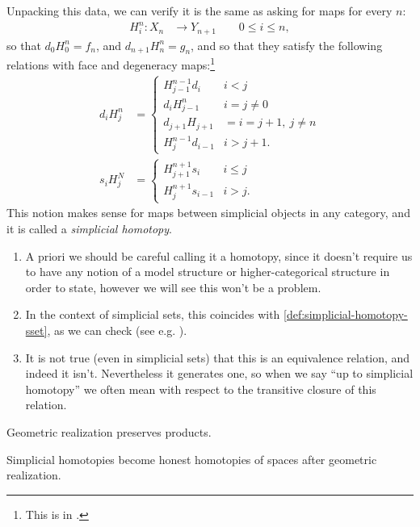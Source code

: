 \documentclass[11pt]{amsart}
\begin{document}
\begin{remark}
Unpacking this data, we can verify it is the same as asking for maps for every $n$:
\begin{align*}
    H_i^n \colon X_n &\to Y_{n+1} \quad\quad 0\le i\le n,
\end{align*}
so that $d_0 H_0^n = f_n$, and $d_{n+1}H_n^n = g_n$, and so that they satisfy the following relations with face and degeneracy maps:\footnote{%
This is in \cite[8.3.11]{Weibel}.
}
\begin{align*}
    d_i H_j^n &= \begin{cases}
    H_{j-1}^{n-1}d_i & i<j \\
    d_i H_{j-1}^n & i=j\ne 0 \\
    d_{j+1} H_{j+1} &= i = j+1,\ j\ne n \\
    H_{j}^{n-1} d_{i-1} & i > j+1.
    \end{cases} \\
    s_i H_j^N &= \begin{cases}
    H_{j+1}^{n+1} s_i & i\le j \\
    H_{j}^{n+1} s_{i-1} & i>j.
    \end{cases}
\end{align*}
This notion makes sense for maps between simplicial objects in any category, and it is called a \textit{simplicial homotopy}.
\begin{enumerate}
    \item A priori we should be careful calling it a homotopy, since it doesn't require us to have any notion of a model structure or higher-categorical structure in order to state, however we will see this won't be a problem.
    \item In the context of simplicial sets, this coincides with \autoref{def:simplicial-homotopy-sset}, as we can check (see e.g. \cite[8.3.12]{Weibel}).
    \item It is not true (even in simplicial sets) that this is an equivalence relation, and indeed it isn't. Nevertheless it generates one, so when we say ``up to simplicial homotopy'' we often mean with respect to the transitive closure of this relation.
\end{enumerate}
\end{remark}


\begin{theorem} Geometric realization preserves products.
\end{theorem}

\begin{corollary} Simplicial homotopies become honest homotopies of spaces after geometric realization.
\end{corollary}
\end{document}
